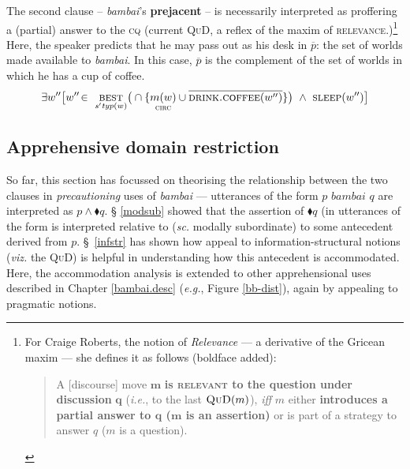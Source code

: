 	\a The second clause -- \textit{bambai}'s \textbf{prejacent} -- is necessarily interpreted as proffering a (partial) answer to the \textsc{cq} (current \textsc{QuD}, a reflex of the maxim of \textsc{relevance}.)\footnote{For Craige Roberts, the notion of \textit{Relevance} --- a derivative of the Gricean maxim --- she defines it as follows (boldface added):
	
\begin{quote}
	A [discourse] move $\boldsymbol m $ \textbf{is \textsc{relevant} to the question under discussion} $ \boldsymbol q $ (\textit{i.e.}, to the last $ \textsc{QuD}(m) $), \textit{iff} $ m $ either \textbf{introduces a partial answer to $ \boldsymbol q $ ($\boldsymbol m $ is an assertion)} or is part of a strategy to answer $ q $ ($ m $ is a question).
\end{quote}


\label{rob-rel}} Here, the speaker predicts that he may pass out as his desk in $ \overline{p} $: the set of worlds made available to \textit{bambai}. In this case, $ \overline p $ is the complement of the set of worlds in which he has a cup of coffee.
$$\exists w^{\prime\prime}\big[w''\!\in\ \underset{\mathit{s'typ}(w)}{\textsc{best}}\big(\cap\{ \underset{\textsc{circ}}{m(w)}\cup\overline{\textsc{drink.coffee}(w^{\prime\prime})}\}\big)\ \wedge\ \textsc{sleep}(w^{\prime\prime})\big]$$
	
	

	
\xe


\subsection{Apprehensive domain restriction}

So far, this section has focussed on theorising the relationship between the two clauses in \textit{precautioning} uses of \textit{bambai} --- utterances of the form $ p\textit{ bambai }q $ are interpreted as $ p\wedge\blacklozenge q $. § \ref{modsub} showed that the assertion of $ \blacklozenge q $ (in utterances of the form is interpreted relative to (\textit{sc.} modally subordinate) to some antecedent derived from $ p $. \S~\ref{infstr} has shown how appeal to information-structural notions (\textit{viz.} the \textsc{QuD}) is helpful in understanding how this antecedent is accommodated. Here, the accommodation analysis is extended to other apprehensional uses described in Chapter \ref{bambai.desc} (\textit{e.g.}, Figure \ref{bb-dist}), again by appealing to pragmatic notions.


